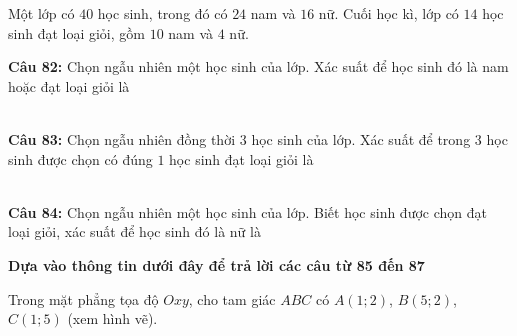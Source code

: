 \documentclass[12pt,a4paper]{article}
\begin{document}
\par\nobreak

Một lớp có $40$ học sinh, trong đó có $24$ nam và $16$ nữ. Cuối học kì, lớp có $14$ học sinh đạt loại giỏi, gồm $10$ nam và $4$ nữ.

\par\nobreak


\noindent \textbf{Câu 82:} Chọn ngẫu nhiên một học sinh của lớp. Xác suất để học sinh đó là nam hoặc đạt loại giỏi là\\
\noindent{}\\[0.25cm]
\noindent{}



\vspace{0.3cm}

\noindent \textbf{Câu 83:} Chọn ngẫu nhiên đồng thời $3$ học sinh của lớp. Xác suất để trong $3$ học sinh được chọn có đúng $1$ học sinh đạt loại giỏi là\\
\noindent{}\\[0.25cm]
\noindent{}



\vspace{0.3cm}

\noindent \textbf{Câu 84:} Chọn ngẫu nhiên một học sinh của lớp. Biết học sinh được chọn đạt loại giỏi, xác suất để học sinh đó là nữ là\\
\noindent{}



\vspace{0.5cm}
\noindent\textbf{Dựa vào thông tin dưới đây để trả lời các câu từ 85 đến 87}%


\par\nobreak

Trong mặt phẳng tọa độ $Oxy$, cho tam giác $ABC$ có $A(1;2)$, $B(5;2)$, $C(1;5)$ (xem hình vẽ).
\end{document}
